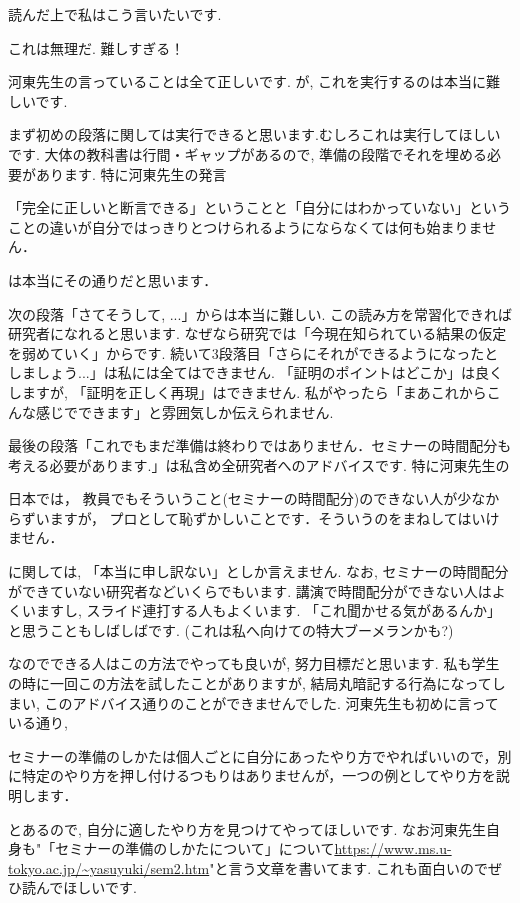 読んだ上で私はこう言いたいです. 
\begin{tcolorbox}[mybox]
\begin{center}
これは無理だ. 難しすぎる！
\end{center}
\end{tcolorbox}
河東先生の言っていることは全て正しいです. 
が, これを実行するのは本当に難しいです. 

まず初めの段落に関しては実行できると思います.むしろこれは実行してほしいです. 
大体の教科書は行間・ギャップがあるので, 準備の段階でそれを埋める必要があります. 
特に河東先生の発言
\begin{tcolorbox}[mybox]
「完全に正しいと断言できる」ということと「自分にはわかっていない」ということの違いが自分ではっきりとつけられるようにならなくては何も始まりません．
\end{tcolorbox}
は本当にその通りだと思います．

次の段落「さてそうして, ...」からは本当に難しい. この読み方を常習化できれば研究者になれると思います. 
なぜなら研究では「今現在知られている結果の仮定を弱めていく」からです. 
続いて3段落目「さらにそれができるようになったとしましょう...」は私には全てはできません. 「証明のポイントはどこか」は良くしますが, 「証明を正しく再現」はできません. 私がやったら「まあこれからこんな感じでできます」と雰囲気しか伝えられません.  

最後の段落「これでもまだ準備は終わりではありません．セミナーの時間配分も考える必要があります.」は私含め全研究者へのアドバイスです. 
特に河東先生の
\begin{tcolorbox}[mybox]
日本では， 教員でもそういうこと(セミナーの時間配分)のできない人が少なからずいますが， プロとして恥ずかしいことです．そういうのをまねしてはいけません．
\end{tcolorbox}
に関しては, 「本当に申し訳ない」としか言えません. 
なお, セミナーの時間配分ができていない研究者などいくらでもいます. 
講演で時間配分ができない人はよくいますし, スライド連打する人もよくいます. 
「これ聞かせる気があるんか」と思うこともしばしばです. (これは私へ向けての特大ブーメランかも?)

なのでできる人はこの方法でやっても良いが, 努力目標だと思います.
私も学生の時に一回この方法を試したことがありますが, 結局丸暗記する行為になってしまい, このアドバイス通りのことができませんでした. 
河東先生も初めに言っている通り, 
\begin{tcolorbox}[mybox]
セミナーの準備のしかたは個人ごとに自分にあったやり方でやればいいので，別に特定のやり方を押し付けるつもりはありませんが，一つの例としてやり方を説明します．
\end{tcolorbox}
とあるので, 自分に適したやり方を見つけてやってほしいです. なお河東先生自身も"「セミナーの準備のしかたについて」について\url{https://www.ms.u-tokyo.ac.jp/~yasuyuki/sem2.htm}"と言う文章を書いてます. これも面白いのでぜひ読んでほしいです. 

